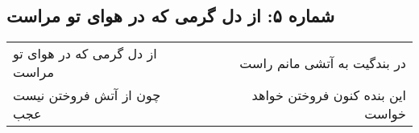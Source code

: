 \begin{center}
\section*{شماره ۵: از دل گرمی که در هوای تو مراست}
\label{sec:005}
\begin{longtable}{l p{0.5cm} r}
از دل گرمی که در هوای تو مراست
&&
در بندگیت به آتشی مانم راست
\\
چون از آتش فروختن نیست عجب
&&
این بنده کنون فروختن خواهد خواست
\\
\end{longtable}
\end{center}

